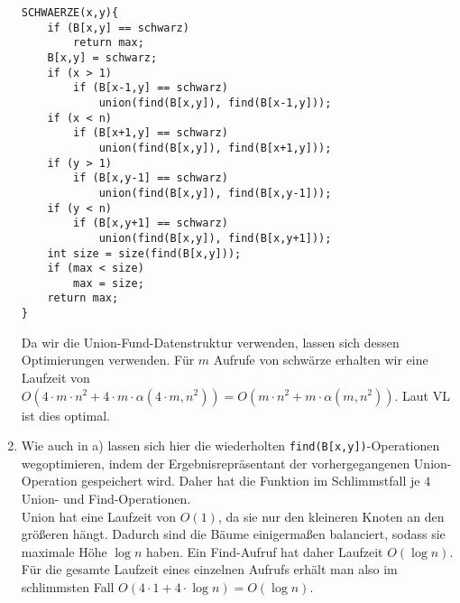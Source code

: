 \documentclass[a4paper,10pt]{article}
\begin{document}
\begin{enumerate}
\begin{lstlisting}
SCHWAERZE(x,y){
	if (B[x,y] == schwarz)
		return max;
	B[x,y] = schwarz;
	if (x > 1)
		if (B[x-1,y] == schwarz)
			union(find(B[x,y]), find(B[x-1,y]));
	if (x < n)
		if (B[x+1,y] == schwarz)
			union(find(B[x,y]), find(B[x+1,y]));
	if (y > 1)
		if (B[x,y-1] == schwarz)
			union(find(B[x,y]), find(B[x,y-1]));
	if (y < n)
		if (B[x,y+1] == schwarz)
			union(find(B[x,y]), find(B[x,y+1]));
	int size = size(find(B[x,y]));
	if (max < size)
		max = size;
	return max;
}
\end{lstlisting}
Da wir die Union-Fund-Datenstruktur verwenden, lassen sich dessen Optimierungen verwenden. Für $m$ Aufrufe von schwärze erhalten wir eine Laufzeit von $O(4 \cdot m \cdot n^2 + 4 \cdot m \cdot \alpha (4 \cdot m, n^2)) = O(m \cdot n^2 + m \cdot \alpha (m, n^2))$. Laut VL ist dies optimal.
\item Wie auch in a) lassen sich hier die wiederholten \texttt{find(B[x,y])}-Operationen wegoptimieren, indem der Ergebnisrepräsentant der vorhergegangenen Union-Operation gespeichert wird. Daher hat die Funktion im Schlimmstfall je $4$ Union- und Find-Operationen.\\
Union hat eine Laufzeit von $O(1)$, da sie nur den kleineren Knoten an den größeren hängt. Dadurch sind die Bäume einigermaßen balanciert, sodass sie maximale Höhe $\log n$ haben. Ein Find-Aufruf hat daher Laufzeit $O(\log n)$.
Für die gesamte Laufzeit eines einzelnen Aufrufs erhält man also im schlimmsten Fall $O(4 \cdot 1 + 4 \cdot \log n) = O(\log n)$.
\end{enumerate}
\end{document}
